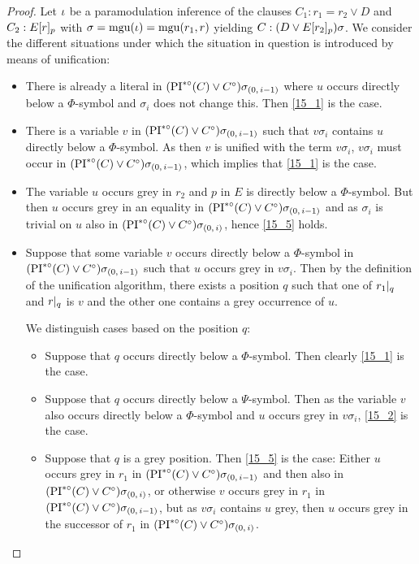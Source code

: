 \documentclass[,%
	draft=false,%
	numbers=noendperiod
	12pt,
	a4paper,
	oneside,%
	openany,
]{memoir}
\newcommand{\inv}{\ensuremath{\PIstarnosigma(C)\lor C\nosigma}}
\newcommand{\invp}{\ensuremath{(\inv)}}
\begin{document}
\begin{proof}
	Let  $\iota$ be a paramodulation inference  of the clauses $C_1: r_1=r_2 \lor D$ and $C_2: E{[r]_{p}}$ with $\sigma=\operatorname{mgu}(\iota)=\operatorname{mgu}(r_1, r)$ yielding $C: (D\lor E{[r_2]_{p}})\sigma$.
	We consider the different situations under which the situation in question is introduced by means of unification: 

	\begin{itemize}
		\item
			There is already a literal in $\invp\sigmazmi$ where $u$ occurs directly below a $\Phi$-symbol and $\sigma_i$ does not change this.
			Then \ref{15_1} is the case.

		\item
			There is a variable $v$ in $\invp\sigmazmi$ such that $v\sigma_i$ contains $u$ directly below a $\Phi$-symbol.
			As then $v$ is unified with the term $v\sigma_i$, $v\sigma_i$ must occur in $\invp\sigmazmi$, which implies that \ref{15_1} is the case.

		\item
			The variable $u$ occurs grey in $r_2$ and $p$ in $E$ is directly below a $\Phi$-symbol. 
			But then $u$ occurs grey in an equality in $\invp\sigmazmi$ and as $\sigma_i$ is trivial on $u$ also in $\invp\sigmazi$, hence \ref{15_5} holds.

		\item
			Suppose that some variable $v$ occurs directly below a $\Phi$-symbol in $\invp\sigmazmi$ such that $u$ occurs grey in $v\sigma_i$.
			Then by the definition of the unification algorithm, there exists a position $q$ such that one of $r_1|_{q}$ and $r|_{q}$ is $v$ and the other one contains a grey occurrence of $u$.

			We distinguish cases based on the position $q$:

			\begin{itemize}
				\item
					Suppose that $q$ occurs directly below a $\Phi$-symbol. Then clearly \ref{15_1} is the case.

				\item
					Suppose that $q$ occurs directly below a $\Psi$-symbol. Then as the variable $v$ also occurs directly below a $\Phi$-symbol and $u$ occurs grey in $v\sigma_i$, \ref{15_2} is the case.

				\item
					Suppose that $q$ is a grey position.
					Then \ref{15_5} is the case: 
					Either $u$ occurs grey in $r_1$ in $\invp\sigmazmi$ and then also in $\invp\sigmazi$, 
					or otherwise $v$ occurs grey in $r_1$ in $\invp\sigmazmi$, but as $v\sigma_i$ contains $u$ grey, then $u$ occurs grey in the successor of $r_1$ in $\invp\sigmazi$.
					\qedhere
			\end{itemize}

	\end{itemize}

\end{proof}
\end{document}
